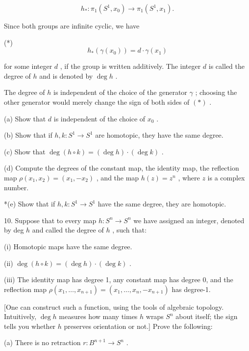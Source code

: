 \[
{h}_{ * } : {\pi }_{1}\left( {{S}^{1},{x}_{0}}\right)  \rightarrow  {\pi }_{1}\left( {{S}^{1},{x}_{1}}\right) .
\]

Since both groups are infinite cyclic, we have

(*)
\[
{h}_{ * }\left( {\gamma \left( {x}_{0}\right) }\right)  = d \cdot  \gamma \left( {x}_{1}\right)
\]

for some integer \(d\) , if the group is written additively. The integer \(d\) is called the degree of \(h\) and is denoted by \(\deg h\) .

The degree of \(h\) is independent of the choice of the generator \(\gamma\) ; choosing the other generator would merely change the sign of both sides of \(\left( *\right)\) .

(a) Show that \(d\) is independent of the choice of \({x}_{0}\) .

(b) Show that if \(h,k : {S}^{1} \rightarrow  {S}^{1}\) are homotopic, they have the same degree.

(c) Show that \(\deg \left( {h \circ  k}\right)  = \left( {\deg h}\right)  \cdot  \left( {\deg k}\right)\) .

(d) Compute the degrees of the constant map, the identity map, the reflection map \(\rho \left( {{x}_{1},{x}_{2}}\right)  = \left( {{x}_{1}, - {x}_{2}}\right)\) , and the map \(h\left( z\right)  = {z}^{n}\) , where \(z\) is a complex number.

*(e) Show that if \(h,k : {S}^{1} \rightarrow  {S}^{1}\) have the same degree, they are homotopic.

10. Suppose that to every map \(h : {S}^{n} \rightarrow  {S}^{n}\) we have assigned an integer, denoted by deg \(h\) and called the degree of \(h\) , such that:

(i) Homotopic maps have the same degree.

(ii) \(\deg \left( {h \circ  k}\right)  = \left( {\deg h}\right)  \cdot  \left( {\deg k}\right)\) .

(iii) The identity map has degree 1, any constant map has degree 0, and the reflection map \(\rho \left( {{x}_{1},\ldots ,{x}_{n + 1}}\right)  = \left( {{x}_{1},\ldots ,{x}_{n}, - {x}_{n + 1}}\right)\) has degree-1.

[One can construct such a function, using the tools of algebraic topology. Intuitively, \(\deg h\) measures how many times \(h\) wraps \({S}^{n}\) about itself; the sign tells you whether \(h\) preserves orientation or not.] Prove the following:

(a) There is no retraction \(r : {B}^{n + 1} \rightarrow  {S}^{n}\) .

